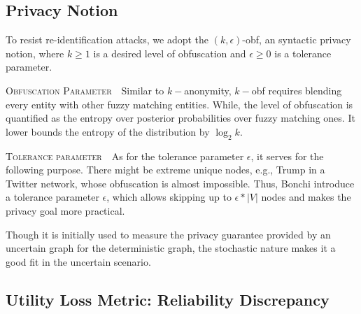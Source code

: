 \subsection{Privacy Notion}
\label{sec:privacyNotion}
To resist re-identification attacks, we adopt the $(k,\epsilon)$-obf, an syntactic privacy notion,
 where $k \ge 1$ is a desired level of obfuscation  and $\epsilon \ge 0$ is a tolerance parameter. 

\textsc{Obfuscation Parameter}~~Similar to $k-$anonymity, $k-$obf requires blending every entity with other fuzzy matching entities. While, the level of obfuscation is quantified as the entropy over posterior probabilities over fuzzy matching ones. It lower bounds the entropy of the distribution by $\log_{2} k$. 

\textsc{Tolerance parameter}~~As for the tolerance parameter $\epsilon$, it serves for the following purpose. There might be extreme unique nodes, e.g., Trump in a Twitter network, whose obfuscation is almost impossible. Thus, Bonchi {\etal} introduce a tolerance parameter $\epsilon$, which allows skipping up to $\epsilon * |V|$ nodes and makes the privacy goal more practical. 

Though it is initially used to measure the privacy guarantee provided by an uncertain graph for the  deterministic graph, the stochastic nature makes it a good fit in the uncertain scenario. 
\subsection{Utility Loss Metric: Reliability Discrepancy}

